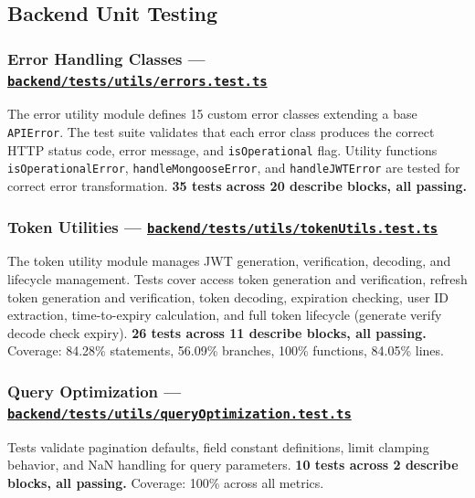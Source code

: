 \documentclass[12pt,letterpaper]{article}
\newcommand{\ghrepo}{https://github.com/omniV1/lunaraCare}
\begin{document}
\subsection{Backend Unit Testing}

\subsubsection{Error Handling Classes --- \href{\ghrepo/blob/main/backend/tests/utils/errors.test.ts}{\texttt{backend/tests/utils/errors.test.ts}}}

The error utility module defines 15 custom error classes extending a base \texttt{APIError}. The test suite validates that each error class produces the correct HTTP status code, error message, and \texttt{isOperational} flag. Utility functions \texttt{isOperationalError}, \texttt{handleMongooseError}, and \texttt{handleJWTError} are tested for correct error transformation. \textbf{35 tests across 20 describe blocks, all passing.}

\subsubsection{Token Utilities --- \href{\ghrepo/blob/main/backend/tests/utils/tokenUtils.test.ts}{\texttt{backend/tests/utils/tokenUtils.test.ts}}}

The token utility module manages JWT generation, verification, decoding, and lifecycle management. Tests cover access token generation and verification, refresh token generation and verification, token decoding, expiration checking, user ID extraction, time-to-expiry calculation, and full token lifecycle (generate \textrightarrow{} verify \textrightarrow{} decode \textrightarrow{} check expiry). \textbf{26 tests across 11 describe blocks, all passing.} Coverage: 84.28\% statements, 56.09\% branches, 100\% functions, 84.05\% lines.

\subsubsection{Query Optimization --- \href{\ghrepo/blob/main/backend/tests/utils/queryOptimization.test.ts}{\texttt{backend/tests/utils/queryOptimization.test.ts}}}

Tests validate pagination defaults, field constant definitions, limit clamping behavior, and NaN handling for query parameters. \textbf{10 tests across 2 describe blocks, all passing.} Coverage: 100\% across all metrics.
\end{document}
